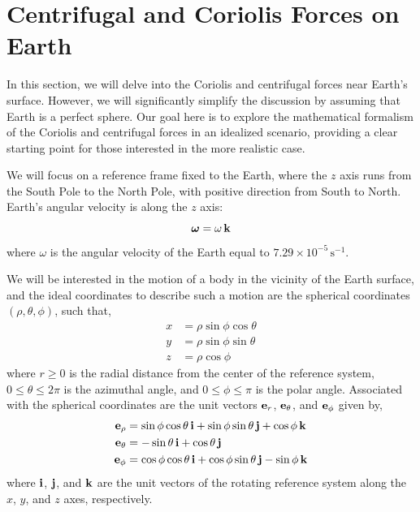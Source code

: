 \documentclass[12pt]{article}
\begin{document}
\section{Centrifugal and Coriolis Forces on Earth}

In this section, we will delve into the Coriolis and centrifugal forces near Earth's surface.
However, we will significantly simplify the discussion by assuming that Earth is a perfect
sphere. Our goal here is to explore the mathematical formalism of the Coriolis and centrifugal
forces in an idealized scenario, providing a clear starting point for those interested in the
more realistic case.

We will focus on a reference frame fixed to the Earth, where the $z$ axis runs from the South
Pole to the North Pole, with positive direction from South to North. Earth's angular velocity
is along the $z$ axis:
\begin{equation}
  \boldsymbol{\omega} = \omega\,\vb{k}
\end{equation}
where $\omega$ is the angular velocity of the Earth equal to $7.29\times10^{-5}\,\text{s}^{-1}$.

We will be interested in the motion of a body in the vicinity of the Earth surface, and the
ideal coordinates to describe such a motion are the spherical coordinates $(\rho, \theta,
\phi)$, such that,
\begin{align}
  x &= \rho\sin\phi\cos\theta \\
  y &= \rho\sin\phi\sin\theta \\
  z &= \rho\cos\phi
\end{align}
where $r \geq 0$ is the radial distance from the center of the reference system,
$0 \leq \theta \leq 2\pi$ is the azimuthal angle, and $0 \leq \phi \leq \pi$ is the polar
angle. Associated with the spherical coordinates are the unit vectors $\vb{e}_r$,
$\vb{e}_\theta$, and $\vb{e}_\phi$ given by,
\begin{align}
  \vb{e}_\rho   &= \sin\phi\cos\theta\,\vb{i} + \sin\phi\sin\theta\,\vb{j} + \cos\phi\,\vb{k} \\
  \vb{e}_\theta &= -\sin\theta\,\vb{i} + \cos\theta\,\vb{j} \\
  \vb{e}_\phi   &= \cos\phi\cos\theta\,\vb{i} + \cos\phi\sin\theta\,\vb{j} - \sin\phi\,\vb{k}
\end{align}
where $\vb{i}$, $\vb{j}$, and $\vb{k}$ are the unit vectors of the rotating reference system
along the $x$, $y$, and $z$ axes, respectively.
\end{document}
